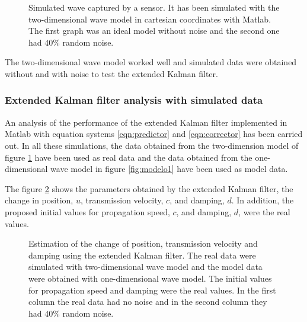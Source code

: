 \documentclass[12pt, a4paper]{article} %
\begin{document}
	\setlength{\parskip}{4mm}
	
	\begin{figure}[h!]
		\centering
		
		\caption{Simulated wave captured by a sensor. It has been simulated with the two-dimensional wave model in cartesian coordinates with Matlab. The first graph was an ideal model without noise and the second one had 40\% random noise.}
		\label{fig:modelo2}
	\end{figure}
	The two-dimensional wave model worked well and simulated data were obtained without and with noise to test the extended Kalman filter.
	
	\setlength{\parskip}{0mm}
	
	\subsubsection{Extended Kalman filter analysis with simulated data}
	
	An analysis of the performance of the extended Kalman filter implemented in Matlab with equation systems \ref{eqn:predictor} and \ref{eqn:corrector} has been carried out. In all these simulations, the data obtained from the two-dimension model of figure \ref{fig:modelo2} have been used as real data and the data obtained from the one-dimensional wave model in figure \ref{fig:modelo1} have been used as model data.
	
	\setlength{\parskip}{4mm}
	
	The figure \ref{fig:kalman1} shows the parameters obtained by the extended Kalman filter, the change in position, $u$, transmission velocity, $c$, and damping, $d$. In addition, the proposed initial values for propagation speed, $c$, and damping, $d$, were the real values.
	
	\begin{figure}[h!]
		\centering
		
		\caption{Estimation of the change of position, transmission velocity and damping using the extended Kalman filter. The real data were simulated with two-dimensional wave model and the model data were obtained with one-dimensional wave model. The initial values for propagation speed and damping were the real values. In the first column the real data had no noise and in the second column they had 40\% random noise.}
		\label{fig:kalman1}
	\end{figure}
	
\end{document}
